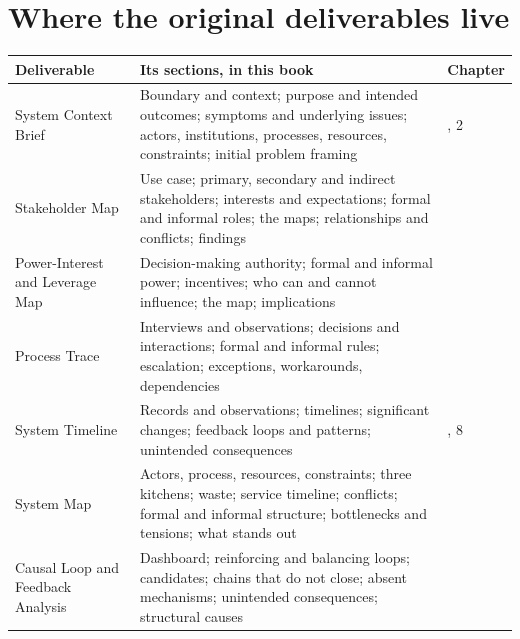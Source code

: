 \documentclass[
  11pt,
  table]{article}
\newcounter{none} %
\begin{document}
\section{Where the original deliverables live}\label{where-the-original-deliverables-live}

{\def\LTcaptype{none} %
\begin{longtable}[]{@{}
  >{\raggedright\arraybackslash}p{}
  >{\raggedright\arraybackslash}p{}
  >{\raggedright\arraybackslash}p{}@{}}
\toprule\noalign{}
\begin{minipage}[b]{\linewidth}\raggedright
Deliverable
\end{minipage} & \begin{minipage}[b]{\linewidth}\raggedright
Its sections, in this book
\end{minipage} & \begin{minipage}[b]{\linewidth}\raggedright
Chapter
\end{minipage} \\
\midrule\noalign{}
\endhead
\bottomrule\noalign{}
\endlastfoot
System Context Brief & Boundary and context; purpose and intended outcomes; symptoms and underlying issues; actors, institutions, processes, resources, constraints; initial problem framing & 1, 2 \\
Stakeholder Map & Use case; primary, secondary and indirect stakeholders; interests and expectations; formal and informal roles; the maps; relationships and conflicts; findings & 3 \\
Power-Interest and Leverage Map & Decision-making authority; formal and informal power; incentives; who can and cannot influence; the map; implications & 4 \\
Process Trace & Interviews and observations; decisions and interactions; formal and informal rules; escalation; exceptions, workarounds, dependencies & 5 \\
System Timeline & Records and observations; timelines; significant changes; feedback loops and patterns; unintended consequences & 6, 8 \\
System Map & Actors, process, resources, constraints; three kitchens; waste; service timeline; conflicts; formal and informal structure; bottlenecks and tensions; what stands out & 7 \\
Causal Loop and Feedback Analysis & Dashboard; reinforcing and balancing loops; candidates; chains that do not close; absent mechanisms; unintended consequences; structural causes & 8 \\

\end{longtable}}
\end{document}
